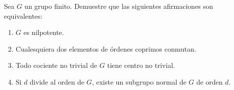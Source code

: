 
\begin{exercise}
\label{xca:nilpotente_equivalencia}
	Sea $G$ un grupo finito. Demuestre que las siguientes afirmaciones son
	equivalentes: 
	\begin{enumerate}
		\item $G$ es nilpotente.
		\item Cualesquiera dos elementos de órdenes coprimos conmutan. 
		\item Todo cociente no trivial de $G$ tiene centro no trivial.
		\item Si $d$ divide al orden de $G$, existe un subgrupo normal de $G$
			de orden $d$.
	\end{enumerate}
\end{exercise}


